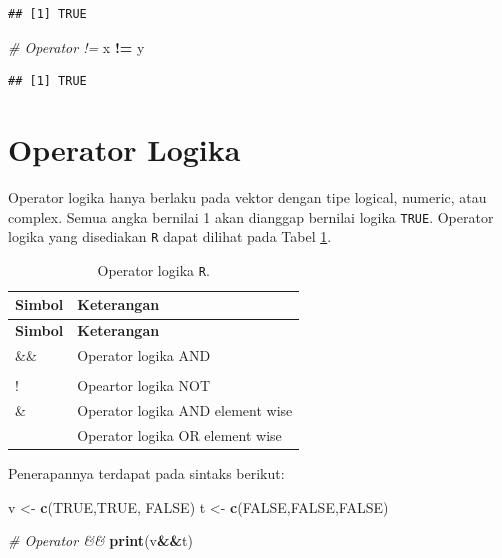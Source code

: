 \documentclass[]{book}
\newenvironment{Shaded}{\begin{snugshade}}{\end{snugshade}}
\newcommand{\KeywordTok}[1]{\textcolor[rgb]{0.13,0.29,0.53}{\textbf{#1}}}
\newcommand{\StringTok}[1]{\textcolor[rgb]{0.31,0.60,0.02}{#1}}
\newcommand{\CommentTok}[1]{\textcolor[rgb]{0.56,0.35,0.01}{\textit{#1}}}
\newcommand{\OtherTok}[1]{\textcolor[rgb]{0.56,0.35,0.01}{#1}}
\newcommand{\OperatorTok}[1]{\textcolor[rgb]{0.81,0.36,0.00}{\textbf{#1}}}
\newcommand{\NormalTok}[1]{#1}
\begin{document}
\begin{verbatim}
## [1] TRUE
\end{verbatim}

\begin{Shaded}
\begin{Highlighting}[]
\CommentTok{# Operator !=}
\NormalTok{x }\OperatorTok{!=}\StringTok{ }\NormalTok{y}
\end{Highlighting}
\end{Shaded}

\begin{verbatim}
## [1] TRUE
\end{verbatim}

\section{Operator Logika}\label{operator-logika}

Operator logika hanya berlaku pada vektor dengan tipe logical, numeric,
atau complex. Semua angka bernilai 1 akan dianggap bernilai logika
\texttt{TRUE}. Operator logika yang disediakan \texttt{R} dapat dilihat
pada Tabel \ref{tab:oplogika}.

\begin{longtable}[]{@{}ll@{}}
\caption{\label{tab:oplogika} Operator logika \texttt{R}.}\tabularnewline
\toprule
\textbf{Simbol} & \textbf{Keterangan}\tabularnewline
\midrule
\endfirsthead
\toprule
\textbf{Simbol} & \textbf{Keterangan}\tabularnewline
\midrule
\endhead
\&\& & Operator logika AND\tabularnewline
&\tabularnewline
! & Opeartor logika NOT\tabularnewline
\& & Operator logika AND element wise\tabularnewline
& Operator logika OR element wise\tabularnewline
\bottomrule
\end{longtable}

Penerapannya terdapat pada sintaks berikut:

\begin{Shaded}
\begin{Highlighting}[]
\NormalTok{v <-}\StringTok{ }\KeywordTok{c}\NormalTok{(}\OtherTok{TRUE}\NormalTok{,}\OtherTok{TRUE}\NormalTok{, }\OtherTok{FALSE}\NormalTok{)}
\NormalTok{t <-}\StringTok{ }\KeywordTok{c}\NormalTok{(}\OtherTok{FALSE}\NormalTok{,}\OtherTok{FALSE}\NormalTok{,}\OtherTok{FALSE}\NormalTok{)}

\CommentTok{# Operator &&}
\KeywordTok{print}\NormalTok{(v}\OperatorTok{&&}\NormalTok{t)}
\end{Highlighting}
\end{Shaded}
\end{document}
